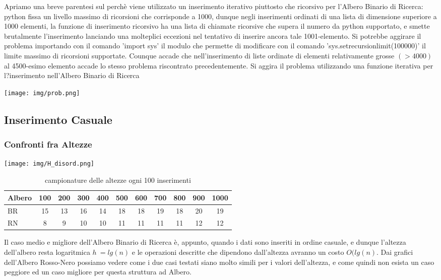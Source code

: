 \documentclass{article}
\begin{document}
Apriamo una breve parentesi sul perchè viene utilizzato un inserimento iterativo piuttosto che ricorsivo per l'Albero Binario di Ricerca: python fissa un livello massimo di ricorsioni che corrisponde a 1000, dunque negli inserimenti ordinati di una lista di dimensione superiore a 1000 elementi, la funzione di inserimento ricorsivo ha una lista di chiamate ricorsive che supera il numero da python supportato, e smette brutalmente l'inserimento lanciando una molteplici eccezioni nel tentativo di inserire ancora tale 1001-elemento. Si potrebbe aggirare il problema importando con il comando 'import sys' il modulo che permette di modificare con il comando 'sys.setrecursionlimit(100000)' il limite massimo di ricorsioni supportate. Counque accade che nell'inserimento di liste ordinate di elementi relativamente grosse $(>4000)$ al 4500-esimo elemento accade lo stesso problema riscontrato precedentemente. Si aggira il problema utilizzando una funzione iterativa per l?inserimento nell'Albero Binario di Ricerca
\begin{center}
    \texttt{[image: img/prob.png]}
\end{center}

\subsection{Inserimento Casuale}

\subsubsection{Confronti fra Altezze}
\begin{center}
    \texttt{[image: img/H\_disord.png]}
\end{center}
\begin{table}[htbp]
\centering 
\caption{campionature delle altezze ogni 100 inserimenti\label{ordInsert}}
\begin{tabular}{l c c c c c c c c c c}
\hline\hline
\multicolumn{1}{c}{\textbf{Albero}}& \textbf{100}& \textbf{200} & \textbf{300}& \textbf{400}& \textbf{500} & \textbf{600}& \textbf{700}& \textbf{800}& \textbf{900}& \textbf{1000}\\ \hline
BR & 15 & 13 & 16 & 14 & 18 & 18 & 19 & 18 & 20 & 19\\
RN & 8 & 9 & 10 & 10 & 11 & 11 & 11 & 11 & 12 & 12\\
\hline
\end{tabular}
\end{table}
Il caso medio e migliore dell'Albero Binario di Ricerca è, appunto, quando i dati sono inseriti in ordine casuale, e dunque l'altezza dell'albero resta logaritmica $h\ = lg(n)$ e le operazioni descritte che dipendono dall'altezza avranno un costo $O(lg(n)$.
Dai grafici dell'Albero Rosso-Nero possiamo vedere come i due casi testati siano molto simili per i valori dell'altezza, e come quindi non esista un caso peggiore ed un caso migliore per questa struttura ad Albero.
\end{document}

